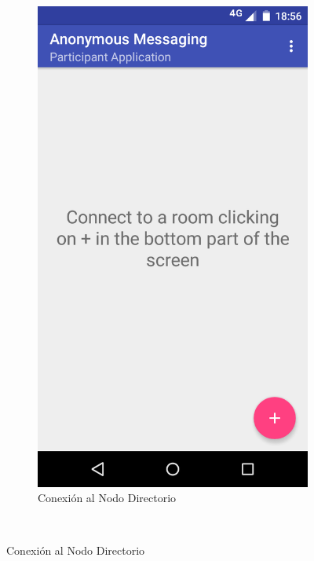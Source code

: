 \begin{figure}[H]
    \centering
    \begin{subfigure}[b]{0.4\textwidth}
        \includegraphics[width=\textwidth]{imagenes/mobile_first.png}
        \caption{Conexión al Nodo Directorio}
        \label{fig:mobile_connect}
    \end{subfigure}
    ~ %

\end{figure}
